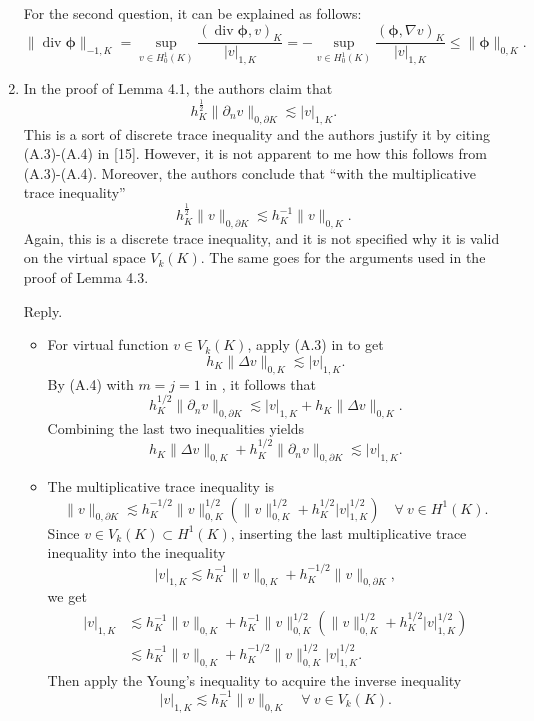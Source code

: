 \documentclass[10pt]{amsart}
\theoremstyle{definition}
\theoremstyle{remark}
\renewcommand{\div}{\operatorname{div}}
\begin{document}
\begin{enumerate}[1.]
For the second question, it can be explained as follows:
$$
\|\div\boldsymbol{\phi}\|_{-1,K}=\sup_{v\in H_0^1(K)}\frac{(\div\boldsymbol{\phi}, v)_K}{|v|_{1,K}}=-\sup_{v\in H_0^1(K)}\frac{(\boldsymbol{\phi}, \nabla v)_K}{|v|_{1,K}} \leq \|\boldsymbol{\phi}\|_{0,K}.
$$

\medskip

\item \textsf{In the proof of Lemma 4.1, the authors claim that
$$
h_K^{\frac{1}{2}}\|\partial_nv\|_{0,\partial K}\lesssim |v|_{1,K}.
$$
This is a sort of discrete trace inequality and the authors justify it by citing (A.3)-(A.4) in [15]. However, it is not apparent to me how this follows from (A.3)-(A.4). Moreover, the authors conclude that “with the multiplicative trace inequality”
$$
h_K^{\frac{1}{2}}\|v\|_{0,\partial K}\lesssim h_K^{-1}\|v\|_{0,K}.
$$
Again, this is a discrete trace inequality, and it is not specified why it is valid on the virtual space $V_k(K)$. The same goes for the arguments used in the proof of Lemma 4.3.}

\smallskip \noindent \textcolor[rgb]{1.00,0.00,0.00}{Reply.}
\begin{itemize}
    \item 
For virtual function $v\in V_k(K)$, apply (A.3) in \cite{ChenHuang2020ncvem} to get
\[
h_K\|\Delta v\|_{0,K}\lesssim |v|_{1,K}.
\]
By (A.4) with $m=j=1$ in \cite{ChenHuang2020ncvem}, it follows that
\[
h_K^{1/2}\|\partial_nv\|_{0,\partial K}\lesssim |v|_{1,K}+h_K\|\Delta v\|_{0,K}.
\]
Combining the last two inequalities yields
\[
h_K\|\Delta v\|_{0,K}+h_K^{1/2}\|\partial_nv\|_{0,\partial K}\lesssim |v|_{1,K}.
\]
\item The multiplicative trace inequality is
\[
\|v\|_{0,\partial K}\lesssim h_K^{-1/2}\|v\|_{0,K}^{1/2}(\|v\|_{0,K}^{1/2}+h_K^{1/2}|v|_{1,K}^{1/2}) \quad\forall~v\in H^1(K).
\]
Since $v\in V_k(K)\subset H^1(K)$, inserting the last multiplicative trace inequality into the inequality
\[
|v|_{1,K}\lesssim h_K^{-1}\|v\|_{0,K}+h_K^{-1/2}\|v\|_{0,\partial K},
\]
we get
\begin{align*}
|v|_{1,K}&\lesssim h_K^{-1}\|v\|_{0,K}+h_K^{-1}\|v\|_{0,K}^{1/2}(\|v\|_{0,K}^{1/2}+h_K^{1/2}|v|_{1,K}^{1/2}) \\
&\lesssim h_K^{-1}\|v\|_{0,K}+h_K^{-1/2}\|v\|_{0,K}^{1/2}|v|_{1,K}^{1/2}.
\end{align*}
Then apply the Young's inequality to acquire the inverse inequality
\begin{equation*}%
|v|_{1,K}\lesssim h_K^{-1}\|v\|_{0,K}\quad\forall~v\in V_k(K).  
\end{equation*}
\end{itemize}


\end{enumerate}
\end{document}
